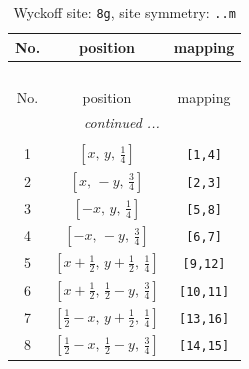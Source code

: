 \documentclass[fleqn,8pt]{jsarticle}
\begin{document}
\begin{longtable}{ccc}
\caption{Wyckoff site: {\tt 8g}, site symmetry: {\tt ..m}}
 \\
 \hline \hline
No. & position & mapping \\ \hline \endfirsthead

\multicolumn{2}{l}{\tablename\ \thetable{}} \\
 \hline \hline
No. & position & mapping \\ \hline \endhead

 \hline \hline
\multicolumn{2}{r}{\footnotesize\it continued ...} \\ \endfoot

 \hline \hline
\multicolumn{2}{r}{} \\ \endlastfoot

1 & $\left[ x,\, y,\, \frac{1}{4} \right]$ & {\tt [1,4]} \\ \hline
2 & $\left[ x,\, - y,\, \frac{3}{4} \right]$ & {\tt [2,3]} \\ \hline
3 & $\left[ - x,\, y,\, \frac{1}{4} \right]$ & {\tt [5,8]} \\ \hline
4 & $\left[ - x,\, - y,\, \frac{3}{4} \right]$ & {\tt [6,7]} \\ \hline
5 & $\left[ x + \frac{1}{2},\, y + \frac{1}{2},\, \frac{1}{4} \right]$ & {\tt [9,12]} \\ \hline
6 & $\left[ x + \frac{1}{2},\, \frac{1}{2} - y,\, \frac{3}{4} \right]$ & {\tt [10,11]} \\ \hline
7 & $\left[ \frac{1}{2} - x,\, y + \frac{1}{2},\, \frac{1}{4} \right]$ & {\tt [13,16]} \\ \hline
8 & $\left[ \frac{1}{2} - x,\, \frac{1}{2} - y,\, \frac{3}{4} \right]$ & {\tt [14,15]} \\
\end{longtable}
\renewcommand{\arraystretch}{1.2}
\end{document}
